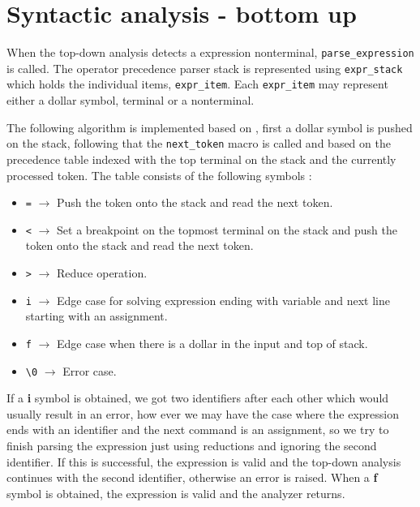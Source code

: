 \documentclass[11pt]{article}
\begin{document}
\restoregeometry






\section{Syntactic analysis - bottom up}

When the top-down analysis detects a expression nonterminal, \texttt{parse\_expression} is called. The operator precedence parser stack is represented using \texttt{expr\_stack} which holds the individual items, \texttt{expr\_item}. Each \texttt{expr\_item} may represent either a dollar symbol, terminal or a nonterminal.

The following algorithm is implemented based on \cite[p.~236]{aho86}, first a dollar symbol is pushed on the stack, following that the \texttt{next\_token} macro is called and based on the precedence table indexed with the top terminal on the stack and the currently processed token. The table consists of the following symbols :
\begin{itemize}
\item \texttt{=} $\rightarrow$ Push the token onto the stack and read the next token.
\item \texttt{<} $\rightarrow$  Set a breakpoint on the topmost terminal on the stack and push the token onto the stack and read the next token.
\item \texttt{>} $\rightarrow$  Reduce operation.
\item \texttt{i} $\rightarrow$  Edge case for solving expression ending with variable and next line starting with an assignment.
\item \texttt{f} $\rightarrow$  Edge case when there is a dollar in the input and top of stack.
\item \texttt{\textbackslash 0} $\rightarrow$  Error case.
\end{itemize}

If a \textbf{i} symbol is obtained, we got two identifiers after each other which would usually result in an error, how ever we may have the case where the expression ends with an identifier and the next command is an assignment, so we try to finish parsing the expression just using reductions and ignoring the second identifier. If this is successful, the expression is valid and the top-down analysis continues with the second identifier, otherwise an error is raised.
When a \textbf{f} symbol is obtained, the expression is valid and the analyzer returns.
\end{document}
